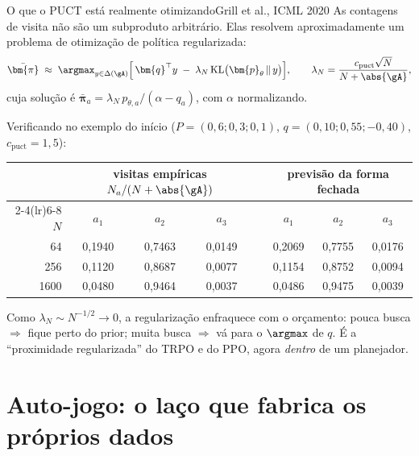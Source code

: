 \documentclass[aspectratio=169, 10pt]{beamer}
\newcommand{\cpuct}{c_{\mathrm{puct}}}
\newcommand{\Nvis}{N}
\newcommand{\redepol}{\bm{p}_{\theta}}
\newcommand{\raizpol}{\bm{\pi}}
\begin{document}
\begin{frame}{O que o PUCT está realmente otimizando}{Grill et al., ICML 2020}
  \footnotesize
  As contagens de visita não são um subproduto arbitrário. Elas resolvem
  aproximadamente um problema de \alert{otimização de política regularizada}:
  \[
    \bar{\raizpol} \;\approx\; \argmax_{y \in \Delta(\gA)}
      \Bigl[\, \bm{q}^{\top} y \;-\; \lambda_{\Nvis}\,\mathrm{KL}\bigl(\redepol \,\|\, y\bigr) \Bigr],
    \qquad
    \lambda_{\Nvis} = \frac{\cpuct \sqrt{\Nvis}}{\Nvis + \abs{\gA}},
  \]
  cuja solução é
  $\bar{\raizpol}_a = \lambda_{\Nvis}\, p_{\theta,a} / (\alpha - q_a)$, com $\alpha$ normalizando.
  \smallskip

  Verificando no exemplo do início ($P=(0{,}6;0{,}3;0{,}1)$, $q=(0{,}10;0{,}55;-0{,}40)$, $\cpuct=1{,}5$):

  \centering\tiny
  \begin{tabular}{r ccc c ccc}
    \toprule
    & \multicolumn{3}{c}{visitas empíricas $\Nvis_a/(\Nvis+\abs{\gA})$} && \multicolumn{3}{c}{previsão da forma fechada} \\
    \cmidrule(lr){2-4}\cmidrule(lr){6-8}
    $\Nvis$ & $a_1$ & $a_2$ & $a_3$ && $a_1$ & $a_2$ & $a_3$ \\
    \midrule
    64   & 0,1940 & 0,7463 & 0,0149 && 0,2069 & 0,7755 & 0,0176 \\
    256  & 0,1120 & 0,8687 & 0,0077 && 0,1154 & 0,8752 & 0,0094 \\
    1600 & 0,0480 & 0,9464 & 0,0037 && 0,0486 & 0,9475 & 0,0039 \\
    \bottomrule
  \end{tabular}

  \medskip
  \vspace{-0.35em}
  \begin{ideiabox}
    Como $\lambda_{\Nvis} \sim \Nvis^{-1/2} \to 0$, a regularização enfraquece com
    o orçamento: pouca busca $\Rightarrow$ fique perto do prior; muita busca
    $\Rightarrow$ vá para o $\argmax$ de $q$. É a ``proximidade regularizada'' do
    TRPO e do PPO, agora \emph{dentro} de um planejador.
  \end{ideiabox}
\end{frame}

\section{Auto-jogo: o laço que fabrica os próprios dados}
\end{document}
